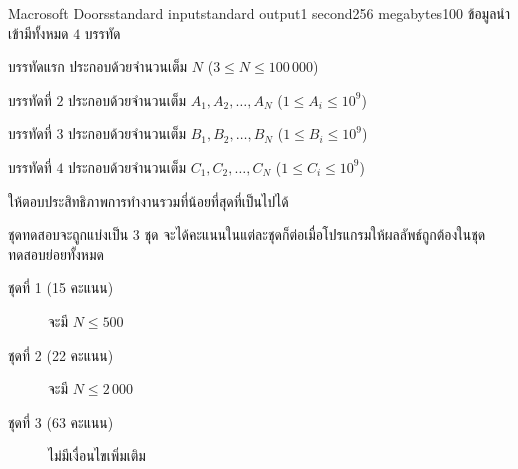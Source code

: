 \documentclass[11pt,a4paper]{article}
\begin{document}
\begin{problem}{Macrosoft Doors}{standard input}{standard output}{1 second}{256 megabytes}{100}
\InputFile
ข้อมูลนำเข้ามีทั้งหมด $4$ บรรทัด

บรรทัดแรก ประกอบด้วยจำนวนเต็ม $N$ ($3 \leq N \leq 100\,000$)

บรรทัดที่ $2$ ประกอบด้วยจำนวนเต็ม $A_1, A_2, \dots, A_N$ ($1 \leq A_i \leq 10^9$)

บรรทัดที่ $3$ ประกอบด้วยจำนวนเต็ม $B_1, B_2, \dots, B_N$ ($1 \leq B_i \leq 10^9$)

บรรทัดที่ $4$ ประกอบด้วยจำนวนเต็ม $C_1, C_2, \dots, C_N$ ($1 \leq C_i \leq 10^9$)

\OutputFile
ให้ตอบประสิทธิภาพการทำงานรวมที่น้อยที่สุดที่เป็นไปได้

\Scoring
ชุดทดสอบจะถูกแบ่งเป็น 3 ชุด จะได้คะแนนในแต่ละชุดก็ต่อเมื่อโปรแกรมให้ผลลัพธ์ถูกต้องในชุดทดสอบย่อยทั้งหมด

\begin{description}

\item[ชุดที่ 1 (15 คะแนน)] จะมี $N \leq 500$

\item[ชุดที่ 2 (22 คะแนน)] จะมี $N \leq 2\,000$

\item[ชุดที่ 3 (63 คะแนน)] ไม่มีเงื่อนไขเพิ่มเติม

\end{description}

\Examples

\begin{example}
%
%
\end{example}

\end{problem}
\end{document}
